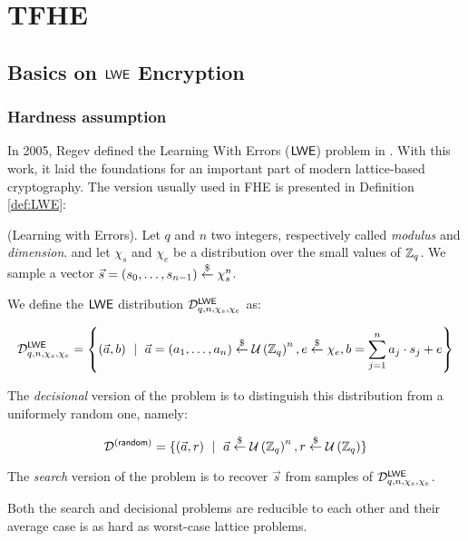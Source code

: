 
\chapter{TFHE}



\section{Basics on $\textsf{LWE}$ Encryption}


\subsection{Hardness assumption}


In 2005, Regev defined the Learning With Errors ($\textsf{LWE}$) problem in \cite{regev}. With this work, it laid the foundations for an important part of modern lattice-based cryptography. The version usually used in FHE is presented in Definition \ref{def:LWE}:


\begin{definition}
	(Learning with Errors). Let $q$ and $n$ two integers, respectively called \textit{modulus} and \textit{dimension}.  and let $\chi_s$ and $\chi_e$ be a distribution over the small values of $\mathbb{Z}_q$. We sample a vector $\vec s = (s_0, \dots, s_{n-1}) \overset{\$}{\leftarrow} \chi_s^n$. 
	
	We define the $\textsf{LWE}$ distribution $\mathcal{D}_{q, n, \chi_s, \chi_e}^{\textsf{LWE}}$ as:
	
	 \[
	 \mathcal{D}_{q, n, \chi_s, \chi_e}^{\textsf{LWE}} = \left \{(\vec a, b)~\mid~\vec a = (a_1, \dots, a_n) \overset{\$}{\leftarrow} \mathcal U \left ( \mathbb{Z}_q \right )^n, e \overset{\$}{\leftarrow} \chi_e, b = \sum_{j=1}^n a_j \cdot s_j + e \right \}
	  \]
	 
	 The \textit{decisional} version of the problem is to distinguish this distribution from a uniformely random one, namely:
	
	\[\mathcal{D}^{(\textsf{random})} = \{(\vec a, r)~\mid~\vec a \overset{\$}{\leftarrow} \mathcal U \left ( \mathbb{Z}_q \right )^n, r \overset{\$}{\leftarrow} \mathcal U \left ( \mathbb{Z}_q \right )\}\]

	The \emph{search} version of the problem is to recover $\vec s$ from samples of $\mathcal{D}_{q, n, \chi_s, \chi_e}^{\textsf{LWE}}$. 
	\label{def:LWE}
\end{definition}



Both the search and decisional problems are reducible to each other \cite{Regev-LWE} and their average case is as hard as worst-case lattice problems.


